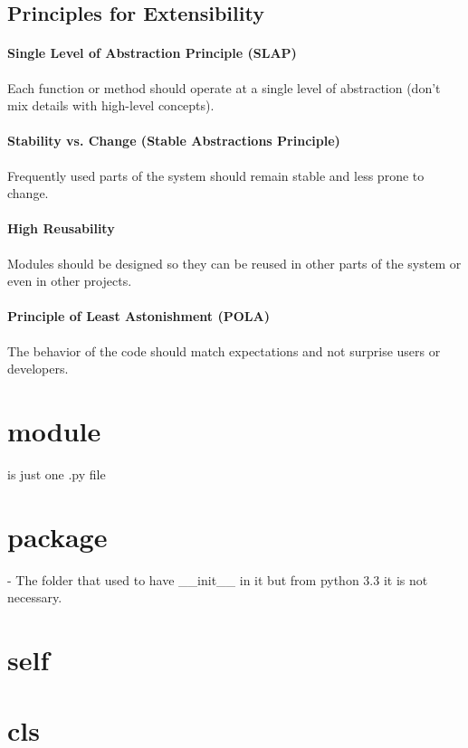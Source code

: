 \subsection{Principles for Extensibility}
    
    \paragraph{Single Level of Abstraction Principle (SLAP)}
        Each function or method should operate at a single level of abstraction (don’t mix details with high-level concepts).
    
    \paragraph{Stability vs. Change (Stable Abstractions Principle)}
        Frequently used parts of the system should remain stable and less prone to change.
    
    \paragraph{High Reusability}
        Modules should be designed so they can be reused in other parts of the system or even in other projects.
    
    \paragraph{Principle of Least Astonishment (POLA)}
        The behavior of the code should match expectations and not surprise users or developers.

\section{module}
is just one .py file

\section{package}

- The folder that used to have \_\_init\_\_ in it but from python 3.3 it is not necessary.

\section{self}

\section{cls}

